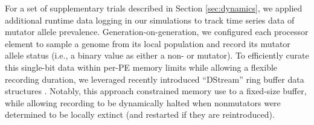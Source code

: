 For a set of supplementary trials described in Section \ref{sec:dynamics}, we applied additional runtime data logging in our simulations to track time series data of mutator allele prevalence.
Generation-on-generation, we configured each processor element to sample a genome from its local population and record its mutator allele status (i.e., a binary value as either a non- or mutator).
To efficiently curate this single-bit data within per-PE memory limits while allowing a flexible recording duration, we leveraged recently introduced ``DStream'' ring buffer data structures \citep{moreno2024algorithms}.
Notably, this approach constrained memory use to a fixed-size buffer, while allowing recording to be dynamically halted when nonmutators were determined to be locally extinct (and restarted if they are reintroduced).




